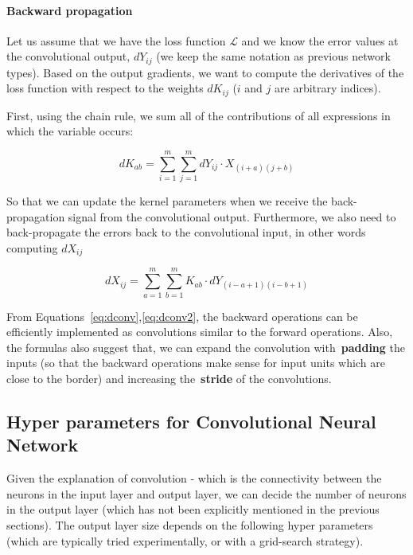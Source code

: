 \paragraph{Backward propagation} Let us assume that we have the loss function $\mathcal{L}$ and we know the error values at the convolutional output, $dY_{ij}$ (we keep the same notation as previous network types). Based on the output gradients, we want to compute the derivatives of the loss function with respect to the weights $dK_{ij}$ ($i$ and $j$ are arbitrary indices). 

First, using the chain rule, we sum all of the contributions of all expressions in which the variable occurs:

\begin{equation}
dK_{ab} = \sum_{i=1}^{m} \sum_{j=1}^{m} dY_{ij} \cdot  X_{(i+a)(j+b)}
\label{eq:dconv}
\end{equation}

So that we can update the kernel parameters when we receive the back-propagation signal from the convolutional output. Furthermore, we also need to back-propagate the errors back to the convolutional input, in other words computing $dX_{ij}$

\begin{equation}
dX_{ij} = \sum_{a=1}^{m} \sum_{b=1}^{m} K_{ab} \cdot dY_{(i-a+1)(i-b+1)} 
\label{eq:dconv2}
\end{equation}

From Equations~\ref{eq:dconv},\ref{eq:dconv2}, the backward operations can be efficiently implemented as convolutions similar to the forward operations. Also, the formulas also suggest that, we can expand the convolution with~\textbf{padding} the inputs (so that the backward operations make sense for input units which are close to the border) and increasing the~\textbf{stride} of the convolutions. 

\subsection{Hyper parameters for Convolutional Neural Network}

Given the explanation of convolution - which is the connectivity between the neurons in the input layer and output layer, we can decide the number of neurons in the output layer (which has not been explicitly mentioned in the previous sections). The output layer size depends on the following hyper parameters (which are typically tried experimentally, or with a grid-search strategy). 

